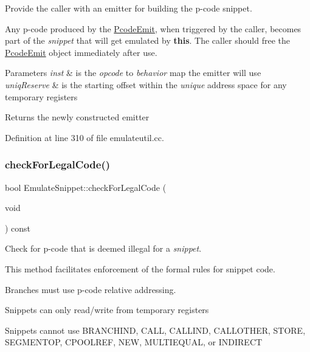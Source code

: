 Provide the caller with an emitter for building the p-\/code snippet. 

Any p-\/code produced by the \mbox{\hyperlink{class_pcode_emit}{Pcode\+Emit}}, when triggered by the caller, becomes part of the {\itshape snippet} that will get emulated by {\bfseries{this}}. The caller should free the \mbox{\hyperlink{class_pcode_emit}{Pcode\+Emit}} object immediately after use. 
\begin{DoxyParams}{Parameters}
{\em inst} & is the {\itshape opcode} to {\itshape behavior} map the emitter will use \\
\hline
{\em uniq\+Reserve} & is the starting offset within the {\itshape unique} address space for any temporary registers \\
\hline
\end{DoxyParams}
\begin{DoxyReturn}{Returns}
the newly constructed emitter 
\end{DoxyReturn}


Definition at line 310 of file emulateutil.\+cc.

\mbox{\label{class_emulate_snippet_ad83f137b630e90877b05ea13f8d1d1be}} 
\subsubsection{\texorpdfstring{checkForLegalCode()}{checkForLegalCode()}}
{\footnotesize\ttfamily bool Emulate\+Snippet\+::check\+For\+Legal\+Code (\begin{DoxyParamCaption}\item[{void}]{ }\end{DoxyParamCaption}) const}



Check for p-\/code that is deemed illegal for a {\itshape snippet}. 

This method facilitates enforcement of the formal rules for snippet code.
\begin{DoxyItemize}
\item Branches must use p-\/code relative addressing.
\item Snippets can only read/write from temporary registers
\item Snippets cannot use B\+R\+A\+N\+C\+H\+I\+ND, C\+A\+LL, C\+A\+L\+L\+I\+ND, C\+A\+L\+L\+O\+T\+H\+ER, S\+T\+O\+RE, S\+E\+G\+M\+E\+N\+T\+OP, C\+P\+O\+O\+L\+R\+EF, N\+EW, M\+U\+L\+T\+I\+E\+Q\+U\+AL, or I\+N\+D\+I\+R\+E\+CT
\end{DoxyItemize}

